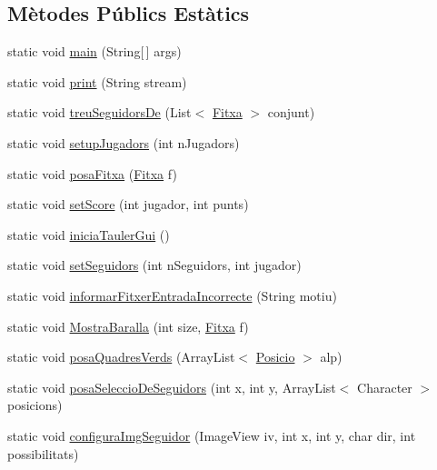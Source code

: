 \subsection*{Mètodes Públics Estàtics}
\begin{DoxyCompactItemize}
\item 
static void \mbox{\hyperlink{class_gui_a147fb18eb48c8635f144795b1b3f79ad}{main}} (String\mbox{[}$\,$\mbox{]} args)
\item 
static void \mbox{\hyperlink{class_gui_a536efde44f03608985f04155cfb829e4}{print}} (String stream)
\item 
static void \mbox{\hyperlink{class_gui_a8e60b9f1428fae6afd4e419d52bc0723}{treu\+Seguidors\+De}} (List$<$ \mbox{\hyperlink{class_fitxa}{Fitxa}} $>$ conjunt)
\item 
static void \mbox{\hyperlink{class_gui_a122d77f189c0b53e90fbbb8810119996}{setup\+Jugadors}} (int n\+Jugadors)
\item 
static void \mbox{\hyperlink{class_gui_a01b6b7eeba0d0730c6307d58df0cc032}{posa\+Fitxa}} (\mbox{\hyperlink{class_fitxa}{Fitxa}} f)
\item 
static void \mbox{\hyperlink{class_gui_ab7fd6a1b1d5fa17562ceed182a64b7c8}{set\+Score}} (int jugador, int punts)
\item 
static void \mbox{\hyperlink{class_gui_ac684b0bf06300f74e400adacc2ec22d1}{inicia\+Tauler\+Gui}} ()
\item 
static void \mbox{\hyperlink{class_gui_a1a14232efb129ae4577c477395f6a09e}{set\+Seguidors}} (int n\+Seguidors, int jugador)
\item 
static void \mbox{\hyperlink{class_gui_a8b9b8f9acdd74b7126e53ac95f3cccb8}{informar\+Fitxer\+Entrada\+Incorrecte}} (String motiu)
\item 
static void \mbox{\hyperlink{class_gui_a6d292368ff728ae4d4b50d90273bf14c}{Mostra\+Baralla}} (int size, \mbox{\hyperlink{class_fitxa}{Fitxa}} f)
\item 
static void \mbox{\hyperlink{class_gui_ad47e710172d53afbd0dfdd410a1c8126}{posa\+Quadres\+Verds}} (Array\+List$<$ \mbox{\hyperlink{class_posicio}{Posicio}} $>$ alp)
\item 
static void \mbox{\hyperlink{class_gui_a34f713e45c926f57aad018e533da18cb}{posa\+Seleccio\+De\+Seguidors}} (int x, int y, Array\+List$<$ Character $>$ posicions)
\item 
static void \mbox{\hyperlink{class_gui_af2be44020696cbe2bce2ff4b90d94cc1}{configura\+Img\+Seguidor}} (Image\+View iv, int x, int y, char dir, int possibilitats)
\item 

\end{DoxyCompactItemize}
